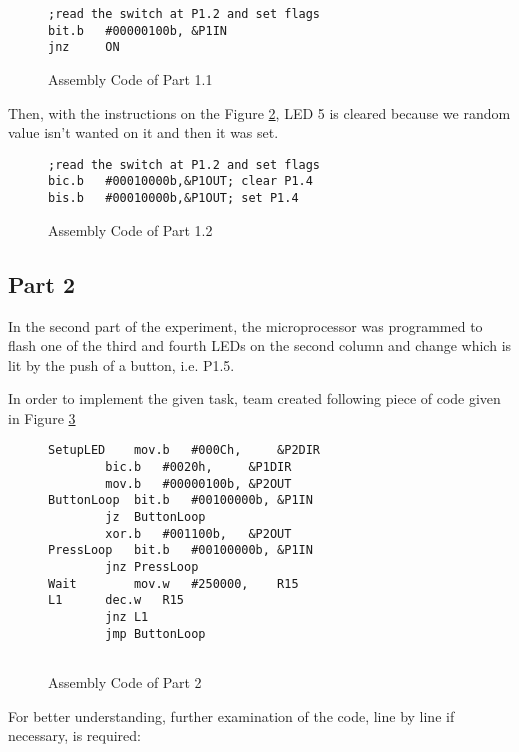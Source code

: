 \documentclass[pdftex,12pt,a4paper]{article}
\begin{document}
\begin{figure}[H]
    \centering
    \begin{lstlisting}[label={code:part1.1}]
;read the switch at P1.2 and set flags
bit.b   #00000100b, &P1IN 
jnz     ON		 
    \end{lstlisting}
    \label{code:part1.1}
    \caption{Assembly Code of Part 1.1}
\end{figure}
Then, with the instructions on the Figure \ref{code:part1.2}, LED 5 is cleared because we random value isn't wanted on it and then it was set.
\begin{figure}[H]
    \centering
    \begin{lstlisting}[label={code:part1.2}]
;read the switch at P1.2 and set flags 
bic.b   #00010000b,&P1OUT; clear P1.4 
bis.b   #00010000b,&P1OUT; set P1.4		 
    \end{lstlisting}
    \label{code:part1.2}
    \caption{Assembly Code of Part 1.2}
\end{figure}

\subsection{Part 2}
In the second part of the experiment, the microprocessor was programmed to flash one of the third and fourth LEDs on the second column and change which is lit by the push of a button, i.e. P1.5.


In order to implement the given task, team created following piece of code given in Figure \ref{code:part2}

\begin{figure}[H]
    \centering
    \begin{lstlisting}[language={[x86masm]Assembler}]
SetupLED	mov.b	#000Ch,		&P2DIR
		bic.b	#0020h,		&P1DIR
		mov.b	#00000100b,	&P2OUT
ButtonLoop	bit.b	#00100000b,	&P1IN
		jz	ButtonLoop
		xor.b	#001100b,	&P2OUT
PressLoop	bit.b	#00100000b,	&P1IN
		jnz	PressLoop
Wait		mov.w	#250000,	R15
L1		dec.w	R15
		jnz	L1
		jmp	ButtonLoop
    
    \end{lstlisting}
    \label{code:part2}
    \caption{Assembly Code of Part 2}
\end{figure}

For better understanding, further examination of the code, line by line if necessary, is required:
\end{document}
